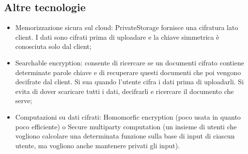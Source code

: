 \subsection{Altre tecnologie}

\begin{itemize}
    \item Memorizzazione sicura sul cloud: PrivateStorage fornisce una cifratura lato client. I dati sono cifrati prima di uploadare e la chiave simmetrica è conosciuta solo dal client;
    \item Searchable encryption: consente di ricercare se un documenti cifrato contiene determinate parole chiave e di recuperare questi documenti che poi vengono decifrate dal client. Si sua quando l'utente cifra i dati prima di uploadarli. Si evita di dover scaricare tutti i dati, decifrarli e ricercare il documento che serve;
    \item Computazioni su dati cifrati: Homomorfic encryption (poco usata in quanto poco efficiente) o Secure multiparty computation (un insieme di utenti che vogliono calcolare una determinata funzione sulla base di input di ciascun utente, ma vogliono anche mantenere privati gli input).
\end{itemize}








